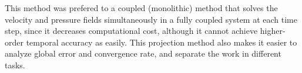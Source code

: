 This method was prefered to a coupled (monolithic) method that solves the velocity and pressure fields simultaneously in a fully coupled system at each time step, since it decreases computational cost, although it cannot achieve higher-order temporal accuracy as easily.
This projection method also makes it easier to analyze global error and convergence rate, and separate the work in different tasks.
